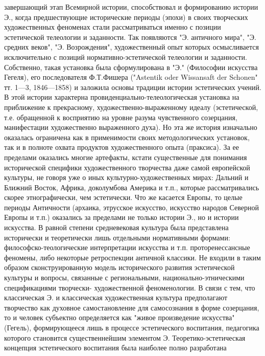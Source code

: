 \documentclass[12pt]{article}
\begin{document}
завершающий этап Всемирной истории, способствовал и формированию истории Э., когда предшествующие
исторические периоды (эпохи) в своих творческих художественных феноменах стали рассматриваться именно с
позиции эстетической телеологии и заданности. Так появляются "Э. античного мира", "Э. средних веков", "Э.
Возрождения",  художественный  опыт  которых  осмысливается  исключительно  с  позиций  нормативно-эстетической телеологии и заданности. Собственно, такая установка была сформулирована в "Э." (Философии
искусства Гегеля), его последователя Ф.Т.Фишера ("Astentik oder Wissansaft der Schonen" тт. 1—3, 1846—1858) и
заложила  основы  традиции  истории  эстетических  учений.  В  этой  истории  характерна  провиденциально-телеологическая установка на приближение к прекрасному, художественно-выраженному идеалу (эстетической,
т.е.  обращенной  к  восприятию  на  уровне  разума  чувственного  созерцания,  манифестации  художественно
выраженного  духа).  Но  эта  же  история  изначально  оказалась  ограничена  как  в  применимости  своих
методологических  установок,  так  и  в  полноте  охвата  продуктов  художественного  опыта  (праксиса).  За  ее
пределами  оказались  многие  артефакты,  кстати  существенные  для  понимания  исторической  специфики
художественного  творчества  даже  самой  европейской  культуры,  не  говоря  уже  о  иных  культурно-художественных  мирах:  Дальний  и  Ближний  Восток,  Африка,  доколумбова  Америка  и  т.п.,  которые
рассматривались  скорее  этнографически,  чем  эстетически.  Что  же  касается  Европы,  то  целые  периоды
Античности (архаика, этрусское искусство, искусство народов Северной Европы и т.п.) оказались за пределами
не только истории Э., но и истории искусства. В равной степени средневековая культура была представлена
исторически  и  теоретически  лишь  отдельными  нормативными  формами:  философско-теологические
интерпретации  искусства  и  т.п.  проторенессансные  феномены,  либо  некоторые  ретроспекции  античной
классики.  Не  входили  в  таким  образом  сконструированную  модель  исторического  развития  эстетической
культуры  и  вопросы,  связанные  с  региональными,  национально-этническими  спецификациями  творчески-
художественной феноменологии. В связи с тем, что классическая Э. и классическая художественная культура
предполагают творчество как духовное самостановление для самосознания в форме созерцания, то и человек
субъектно  определяется  как  "живое  произведение  искусства"  (Гегель),  формирующееся  лишь  в  процессе
эстетического  воспитания,  педагогика  которого  становится  существеннейшим  элементом  Э.  Теоретико-эстетическая концепция эстетического воспитания была наиболее полно разработана
\end{document}
